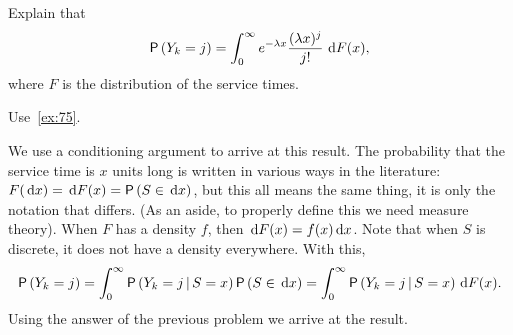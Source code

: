 \begin{exercise}
 Explain that 
\begin{equation}\label{eq:10}
 \P{Y_k = j} = \int_0^\infty e^{-\lambda x}\frac{(\lambda x)^j}{j!}\, \d F(x),
\end{equation}
where $F$ is the distribution of the service times.
\begin{hint}
 Use~\cref{ex:75}.
\end{hint}
\begin{solution}
 We use a conditioning argument to arrive at this result. The
 probability that the service time is $x$ units long is written in
 various ways in the literature: $F(\d x) = \d F(x) = \P{S\in \d x}$,
 but this all means the same thing, it is only the notation that
 differs. (As an aside, to properly define this we need measure
 theory). When $F$ has a density $f$, then
 $\,\text{d}F(x) = f(x) \,\text{d}x$. Note that when $S$ is discrete, it does not
 have a density everywhere. With this,
 \begin{equation*}
 \P{Y_k=j} = \int_0^\infty \P{Y_k =j\given S=x}\P{S\in \d x} =
 \int_0^\infty \P{Y_k =j\given S=x} \d F(x).
 \end{equation*}
 Using the answer of the previous problem we arrive at the result.
\end{solution}
\end{exercise}


